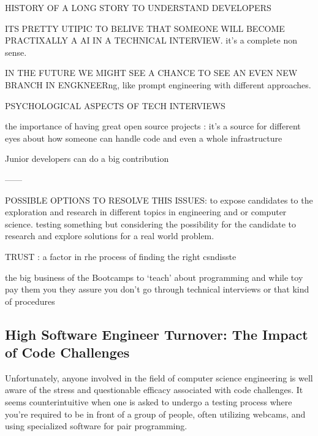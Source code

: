 \documentclass[
    a4paper, %
    10pt, %
    unnumberedsections, %
    twoside, %
]{LTJournalArticle}
\begin{document}






HISTORY OF A LONG STORY TO UNDERSTAND DEVELOPERS 



ITS PRETTY UTIPIC TO BELIVE THAT SOMEONE WILL BECOME PRACTIXALLY A AI IN A TECHNICAL INTERVIEW. it's a complete non sense. 


IN THE FUTURE WE MIGHT SEE A CHANCE TO SEE AN EVEN NEW BRANCH IN ENGKNEERng, like prompt engineering with different approaches.


PSYCHOLOGICAL ASPECTS OF TECH INTERVIEWS 




the importance of having great open source projects : it's a source for different eyes about how someone can handle code and even a whole infrastructure 


Junior developers can do a big contribution 





——


POSSIBLE OPTIONS TO RESOLVE THIS ISSUES:
to expose candidates to the exploration and research in different topics in engineering and or computer science. testing something but considering the possibility for the candidate to research and explore solutions for a real world problem. 



TRUST : a factor in rhe process of finding the right csndisste 



the big business of the Bootcamps to ‘teach’ about programming and while toy pay them you they assure you don't go through technical interviews or that kind of procedures 








\subsection{High Software Engineer Turnover: The Impact of Code Challenges}

Unfortunately, anyone involved in the field of computer science engineering is well aware of the stress and questionable efficacy associated with code challenges. It seems counterintuitive when one is asked to undergo a testing process where you're required to be in front of a group of people, often utilizing webcams, and using specialized software for pair programming.
\end{document}
